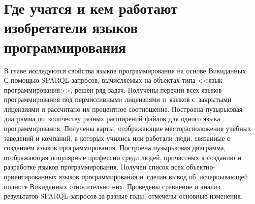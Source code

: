 \chapter{Где учатся и кем работают изобретатели языков программирования}
\label{ch:programming languages}

В главе исследуются свойства языков программирования на основе Викиданных. 
С помощью SPARQL-запросов, вычисляемых на объектах типа <<язык программирования>>, решён ряд задач. 
Получены перечни всех языков программирования под пермиссивными лицензиями 
и~языков с~закрытыми лицензиями и рассчитано их процентное соотношение. 
Построена пузырьковая диаграмма по~количеству разных расширений файлов для одного языка программирования. 
Получены карты, отображающие месторасположение учебных заведений и компаний, 
в которых учились или работали люди, связанные с созданием языков программирования. 
Построена пузырьковая диаграмма, отображающая популярные профессии среди людей, 
причастных к созданию и разработке языков программирования. 
Получен список всех объектно-ориентированных языков программирования 
и~сделан вывод об~исчерпывающей полноте Викиданных относительно них. 
Проведены сравнение и анализ результатов SPARQL-запросов за разные годы, отмечены основные изменения. 

